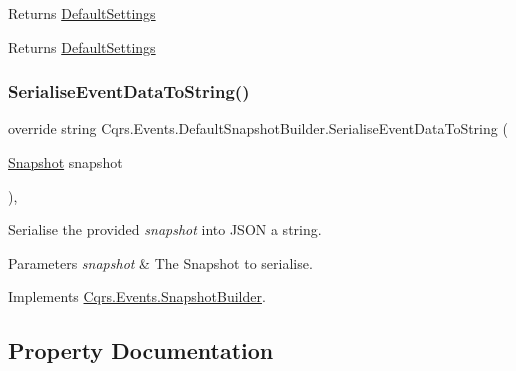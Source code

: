 Returns \hyperlink{classCqrs_1_1Events_1_1DefaultSnapshotBuilder_ab65162b37e4fff19014e145cf163f6ae_ab65162b37e4fff19014e145cf163f6ae}{Default\+Settings} 

\begin{DoxyReturn}{Returns}
\hyperlink{classCqrs_1_1Events_1_1DefaultSnapshotBuilder_ab65162b37e4fff19014e145cf163f6ae_ab65162b37e4fff19014e145cf163f6ae}{Default\+Settings}
\end{DoxyReturn}
\mbox{\label{classCqrs_1_1Events_1_1DefaultSnapshotBuilder_aa7a6bf5a1ba1ed176ecf12170645033e_aa7a6bf5a1ba1ed176ecf12170645033e}} 
\subsubsection{\texorpdfstring{Serialise\+Event\+Data\+To\+String()}{SerialiseEventDataToString()}}
{\footnotesize\ttfamily override string Cqrs.\+Events.\+Default\+Snapshot\+Builder.\+Serialise\+Event\+Data\+To\+String (\begin{DoxyParamCaption}\item[{\hyperlink{classCqrs_1_1Snapshots_1_1Snapshot}{Snapshot}}]{snapshot }\end{DoxyParamCaption})\hspace{0.3cm}{\ttfamily [protected]}, {\ttfamily [virtual]}}



Serialise the provided {\itshape snapshot}  into J\+S\+ON a string. 


\begin{DoxyParams}{Parameters}
{\em snapshot} & The Snapshot to serialise.\\
\hline
\end{DoxyParams}


Implements \hyperlink{classCqrs_1_1Events_1_1SnapshotBuilder_a68fb9e6a5f6f78c01df6802a7f45387f_a68fb9e6a5f6f78c01df6802a7f45387f}{Cqrs.\+Events.\+Snapshot\+Builder}.



\subsection{Property Documentation}
\mbox{\label{classCqrs_1_1Events_1_1DefaultSnapshotBuilder_ab65162b37e4fff19014e145cf163f6ae_ab65162b37e4fff19014e145cf163f6ae}} 
